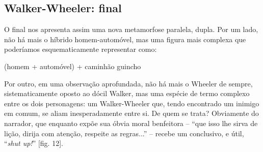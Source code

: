 \begin{multicols}{2}
\section*{Walker-\allowbreak{}Wheeler:\allowbreak{} final}
\par{}O final nos apresenta assim uma nova metamorfose paralela,\allowbreak{} dupla.\allowbreak{} Por um lado,\allowbreak{} não há mais o híbrido homem-\allowbreak{}automóvel,\allowbreak{} mas uma figura mais complexa que poderíamos esquematicamente representar como:\allowbreak{}\par{}(\allowbreak{}homem +\allowbreak{} automóvel)\allowbreak{} +\allowbreak{} caminhão guincho\par{}Por outro,\allowbreak{} em uma observação aprofundada,\allowbreak{} não há mais o Wheeler de sempre,\allowbreak{} sistematicamente oposto ao dócil Walker,\allowbreak{} mas uma espécie de termo complexo entre os dois personagens:\allowbreak{} um Walker-\allowbreak{}Wheeler que,\allowbreak{} tendo encontrado um inimigo em comum,\allowbreak{} se aliam inesperadamente entre si.\allowbreak{} De quem se trata? Obviamente do narrador,\allowbreak{} que enquanto expõe sua óbvia moral benfeitora – “que isso lhe sirva de lição,\allowbreak{} dirija com atenção,\allowbreak{} respeite as regras.\allowbreak{}.\allowbreak{}.\allowbreak{}” – recebe um conclusivo,\allowbreak{} e útil,\allowbreak{} “\textit{shut up!\allowbreak{}}” [fig.\allowbreak{} 12].\allowbreak{}
\par
{
}
\par


\end{multicols}
